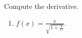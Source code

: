 Compute the derivative.
\begin{multicols}{2}
\begin{enumerate}

\item\label{problemDifferentialtexDivsqrt(1+2divx^2)}  $f(x)=\frac{x }{\sqrt{1+\frac{2}{x^2}}}$.

\end{enumerate}
\end{multicols}
